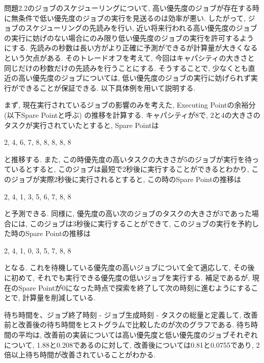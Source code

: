 問題2.2のジョブのスケジューリングについて, 高い優先度のジョブが存在する時に無条件で低い優先度のジョブの実行を見送るのは効率が悪い. 
したがって, ジョブのスケジューリングの先読みを行い, 近い将来行われる高い優先度のジョブの実行に妨げのない場合にのみ限り低い優先度のジョブの実行を許可するようにする. 先読みの秒数は長い方がより正確に予測ができるが計算量が大きくなるという欠点がある. そのトレードオフを考えて, 今回はキャパシティの大きさと同じだけの秒数だけの先読みを行うことにする. そうすることで, 少なくとも直近の高い優先度のジョブについては, 低い優先度のジョブの実行に妨げられず実行ができることが保証できる. 以下具体例を用いて説明する. 

まず, 現在実行されているジョブの影響のみを考えた, Executing Pointの余裕分 (以下Spare Pointと呼ぶ) の推移を計算する. キャパシティが8で, 2と4の大きさのタスクが実行されていたとすると, Spare Pointは

2, 4, 6, 7, 8, 8, 8, 8, 8

\noindent と推移する. また, この時優先度の高いタスクの大きさが5のジョブが実行を待っているとすると, このジョブは最短で2秒後に実行することができるとわかり, このジョブが実際2秒後に実行されるとすると, この時のSpare Pointの推移は

2, 4, 1, 3, 5, 6, 7, 8, 8

\noindent と予測できる. 同様に, 優先度の高い次のジョブのタスクの大きさが3であった場合には, このジョブは3秒後に実行することができて, このジョブの実行を予約した時のSpare Pointの推移は

2, 4, 1, 0, 3, 5, 7, 8, 8

\noindent となる. これを待機している優先度の高いジョブについて全て適応して, その後に初めて, それでも実行できる優先度の低いジョブを実行する.
補足であるが, 現在のSpare Pointが0になった時点で探索を終了して次の時刻に進むようにすることで, 計算量を削減している.

待ち時間を、ジョブ終了時刻 - ジョブ生成時刻 - タスクの総量と定義して, 改善前と改善後の待ち時間をヒストグラムで比較したのが次のグラフである. 
待ち時間の平均は, 改善前の実装については高い優先度と低い優先度のジョブそれぞれについて, 1.88と0.208であるのに対して, 
改善後については0.81と0.0755であり, 2倍以上待ち時間が改善されていることがわかる. 


